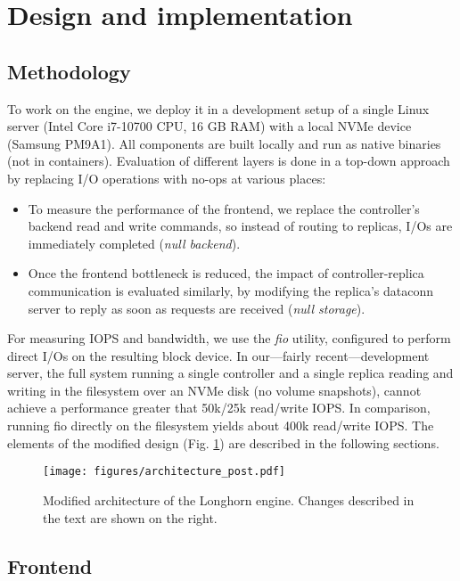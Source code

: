 \section{Design and implementation}

\subsection{Methodology}

To work on the engine, we deploy it in a development setup of a single Linux server (Intel Core i7-10700 CPU, 16 GB RAM) with a local NVMe device (Samsung PM9A1). All components are built locally and run as native binaries (not in containers). Evaluation of different layers is done in a top-down approach by replacing I/O operations with no-ops at various places:
\begin{itemize}
    \item To measure the performance of the frontend, we replace the controller's backend read and write commands, so instead of routing to replicas, I/Os are immediately completed (\textit{null backend}).
    \item Once the frontend bottleneck is reduced, the impact of controller-replica communication is evaluated similarly, by modifying the replica's dataconn server to reply as soon as requests are received (\textit{null storage}).
\end{itemize}
For measuring IOPS and bandwidth, we use the \textit{fio} utility, configured to perform direct I/Os on the resulting block device. In our---fairly recent---development server, the full system running a single controller and a single replica reading and writing in the filesystem over an NVMe disk (no volume snapshots), cannot achieve a performance greater that 50k/25k read/write IOPS. In comparison, running fio directly on the filesystem yields about 400k read/write IOPS.
The elements of the modified design (Fig. \ref{fig:new-sys}) are described in the following sections.

\begin{figure}[htb]
    \centering
    \texttt{[image: figures/architecture\_post.pdf]}
    \caption{Modified architecture of the Longhorn engine. Changes described in the text are shown on the right.}
    \label{fig:new-sys}
\end{figure}

\subsection{Frontend}


